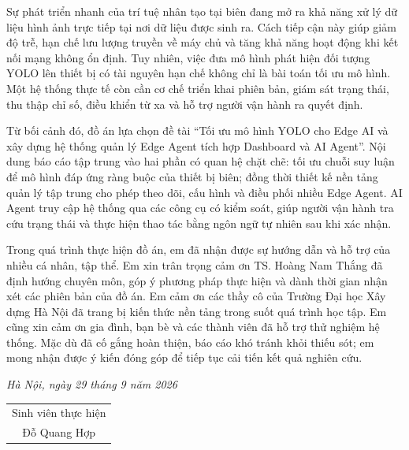 \hypersetup{pageanchor=true}

Sự phát triển nhanh của trí tuệ nhân tạo tại biên đang mở ra khả năng xử lý
dữ liệu hình ảnh trực tiếp tại nơi dữ liệu được sinh ra. Cách tiếp cận này giúp giảm
độ trễ, hạn chế lưu lượng truyền về máy chủ và tăng khả năng hoạt động khi kết nối
mạng không ổn định. Tuy nhiên, việc đưa mô hình phát hiện đối tượng YOLO lên
thiết bị có tài nguyên hạn chế không chỉ là bài toán tối ưu mô hình. Một hệ thống
thực tế còn cần cơ chế triển khai phiên bản, giám sát trạng thái, thu thập chỉ số,
điều khiển từ xa và hỗ trợ người vận hành ra quyết định.

Từ bối cảnh đó, đồ án lựa chọn đề tài ``Tối ưu mô hình YOLO cho Edge AI
và xây dựng hệ thống quản lý Edge Agent tích hợp Dashboard và AI Agent''. Nội
dung báo cáo tập trung vào hai phần có quan hệ chặt chẽ: tối ưu chuỗi suy luận để
mô hình đáp ứng ràng buộc của thiết bị biên; đồng thời thiết kế nền tảng quản lý tập
trung cho phép theo dõi, cấu hình và điều phối nhiều Edge Agent. AI Agent truy
cập hệ thống qua các công cụ có kiểm soát, giúp người vận hành tra cứu trạng thái
và thực hiện thao tác bằng ngôn ngữ tự nhiên sau khi xác nhận.

Trong quá trình thực hiện đồ án, em đã nhận được sự hướng dẫn và hỗ trợ
của nhiều cá nhân, tập thể. Em xin trân trọng cảm ơn TS. Hoàng Nam Thắng đã
định hướng chuyên môn, góp ý phương pháp thực hiện và dành thời gian nhận xét
các phiên bản của đồ án. Em cảm ơn các thầy cô của Trường Đại học Xây dựng Hà
Nội đã trang bị kiến thức nền tảng trong suốt quá trình học tập. Em cũng xin cảm
ơn gia đình, bạn bè và các thành viên đã hỗ trợ thử nghiệm hệ thống. Mặc dù đã
cố gắng hoàn thiện, báo cáo khó tránh khỏi thiếu sót; em mong nhận được ý kiến
đóng góp để tiếp tục cải tiến kết quả nghiên cứu.

\begin{flushright}
\textit{Hà Nội, ngày 29 tháng 9 năm 2026}\\
\begin{tabular}{c}
Sinh viên thực hiện\\[1.8cm]
Đỗ Quang Hợp
\end{tabular}
\end{flushright}
